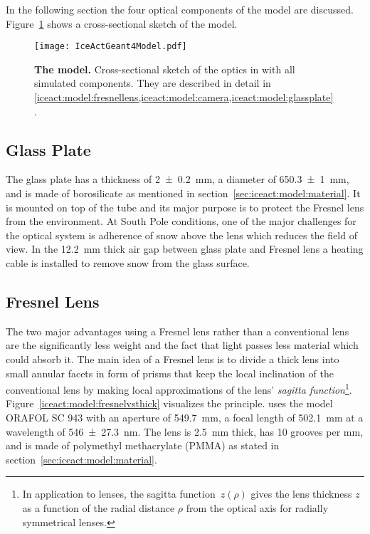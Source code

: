 In the following section the four optical components of the \iceact \geant model are discussed. Figure~\ref{iceact:model:cut} shows a cross-sectional sketch of the model.
\begin{figure}[H]
	\centering
	\texttt{[image: IceActGeant4Model.pdf]}
	\caption[\iceact \geant model]{\textbf{The \iceact \geant model.} Cross-sectional sketch of the \iceact optics in \geant with all simulated components. They are described in detail in \cref{iceact:model:fresnellens,iceact:model:camera,iceact:model:glassplate}.}
	\label{iceact:model:cut}	
\end{figure}

\subsection{Glass Plate}\label{iceact:model:glassplate}

The \iceact glass plate has a thickness of \SI{2+-0.2}{\milli\meter}, a diameter of \SI{650.3+-1}{\milli\meter}, and is made of borosilicate as mentioned in section~\ref{sec:iceact:model:material}. It is mounted on top of the tube and its major purpose is to protect the Fresnel lens from the environment. At South Pole conditions, one of the major challenges for the optical system is adherence of snow above the lens which reduces the field of view. In the \SI{12.2}{\milli\meter} thick air gap between glass plate and Fresnel lens a heating cable is installed to remove snow from the glass surface. 

\subsection{Fresnel Lens}\label{iceact:model:fresnellens}

The two major advantages using a Fresnel lens rather than a conventional lens are the significantly less weight and the fact that light passes less material which could absorb it. The main idea of a Fresnel lens is to divide a thick lens into small annular facets in form of prisms that keep the local inclination of the conventional lens by making local approximations of the lens' \textit{sagitta function}\footnote{In application to lenses, the sagitta function~$z(\rho)$ gives the lens thickness $z$ as a function of the radial distance $\rho$ from the optical axis for radially symmetrical lenses.}. Figure~\ref{iceact:model:fresnelvsthick} visualizes the principle. \iceact uses the model ORAFOL SC 943 with an aperture of \SI{549.7}{\milli\meter}, a focal length of \SI{502.1}{\milli\meter} at a wavelength of \SI{546+-27.3}{\nano\meter}. The lens is \SI{2.5}{\milli\meter} thick, has 10 grooves per \si{\milli\meter}, and is made of polymethyl methacrylate (PMMA) as stated in section~\ref{sec:iceact:model:material}.~\cite{iceact:fresnellens:datasheet}

